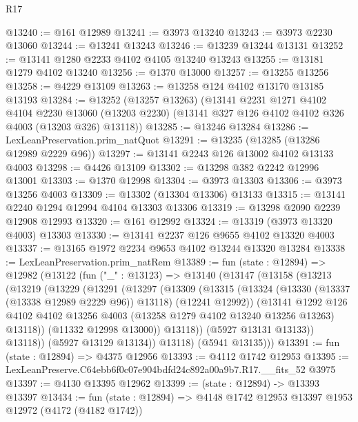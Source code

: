 \begin{lexlean}{R17}
\begin{coremodule}
@13240 := @161 @12989
@13241 := @3973 @13240
@13243 := @3973 @2230 @13060
@13244 := @13241 @13243
@13246 := @13239 @13244 @13131
@13252 := @13141 @1280 @2233 @4102 @4105 @13240 @13243
@13255 := @13181 @1279 @4102 @13240
@13256 := @1370 @13000
@13257 := @13255 @13256
@13258 := @4229 @13109
@13263 := @13258 @124 @4102 @13170 @13185 @13193
@13284 := @13252
    (@13257 @13263)
    (@13141
      @2231
      @1271
      @4102
      @4104
      @2230
      @13060
      (@13203 @2230)
      (@13141 @327 @126 @4102 @4102 @326 @4003 (@13203 @326) @13118))
@13285 := @13246 @13284
@13286 := LexLeanPreservation.prim_natQuot
@13291 := @13235 (@13285 (@13286 @12989 @2229 @96))
@13297 := @13141 @2243 @126 @13002 @4102 @13133 @4003
@13298 := @4426 @13109
@13302 := @13298 @382 @2242 @12996 @13001
@13303 := @1370 @12998
@13304 := @3973 @13303
@13306 := @3973 @13256 @4003
@13309 := @13302 (@13304 @13306) @13133
@13315 := @13141 @2240 @1294 @12994 @4104 @13303 @13306
@13319 := @13298 @2090 @2239 @12908 @12993
@13320 := @161 @12992
@13324 := @13319 (@3973 @13320 @4003) @13303
@13330 := @13141 @2237 @126 @9655 @4102 @13320 @4003
@13337 := @13165 @1972 @2234 @9653 @4102 @13244 @13320 @13284
@13338 := LexLeanPreservation.prim_natRem
@13389 := fun (state : @12894) =>
  @12982
    (@13122
      (fun ("_" : @13123) =>
      @13140
        (@13147
          (@13158
            (@13213
              (@13219
                (@13229
                  (@13291
                    (@13297
                      (@13309
                        (@13315
                          (@13324
                            (@13330 (@13337 (@13338 @12989 @2229 @96)) @13118)
                            (@12241 @12992))
                          (@13141
                            @1292
                            @126
                            @4102
                            @4102
                            @13256
                            @4003
                            (@13258 @1279 @4102 @13240 @13256 @13263)
                            @13118))
                        (@11332 @12998 @13000))
                      @13118))
                  (@5927 @13131 @13133))
                @13118))
            (@5927 @13129 @13134))
          @13118)
        (@5941 @13135)))
@13391 := fun (state : @12894) => @4375 @12956
@13393 := @4112 @1742 @12953
@13395 := LexLeanPreserve.C64ebb6f0c07e904bdfd24c892a00a9b7.R17.__fits_52 @3975
@13397 := @4130 @13395 @12962
@13399 := (state : @12894) -> @13393 @13397
@13434 := fun (state : @12894) =>
  @4148
    @1742
    @12953
    @13397
    @1953
    @12972
    (@4172 (@4182 @1742))

\end{coremodule}
\end{lexlean}
